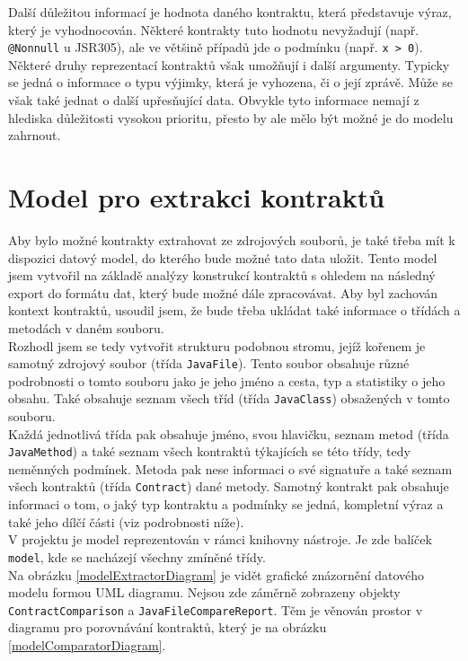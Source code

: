 		Další důležitou informací je hodnota daného kontraktu, která představuje výraz, který je vyhodnocován. Některé kontrakty tuto hodnotu nevyžadují (např. \texttt{@Nonnull} u JSR305), ale ve většině případů jde o podmínku (např. \texttt{x > 0}). Některé druhy reprezentací kontraktů však umožňují i další argumenty. Typicky se jedná o informace o typu výjimky, která je vyhozena, či o její zprávě. Může se však také jednat o další upřesňující data. Obvykle tyto informace nemají z hlediska důležitosti vysokou prioritu, přesto by ale mělo být možné je do modelu zahrnout.
		
	
	\section{Model pro extrakci kontraktů}
			Aby bylo možné kontrakty extrahovat ze zdrojových souborů, je také třeba mít k dispozici datový model, do kterého bude možné tato data uložit. Tento model jsem vytvořil na základě analýzy konstrukcí kontraktů s ohledem na následný export do formátu dat, který bude možné dále zpracovávat. Aby byl zachován kontext kontraktů, usoudil jsem, že bude třeba ukládat také informace o třídách a metodách v daném souboru.\\
			
			Rozhodl jsem se tedy vytvořit strukturu podobnou stromu, jejíž kořenem je samotný zdrojový soubor (třída \texttt{JavaFile}). Tento soubor obsahuje různé podrobnosti o tomto souboru jako je jeho jméno a cesta, typ a statistiky o jeho obsahu. Také obsahuje seznam všech tříd (třída \texttt{JavaClass}) obsažených v tomto souboru.\\
			
			Každá jednotlivá třída pak obsahuje jméno, svou hlavičku, seznam metod (třída \texttt{JavaMethod}) a také seznam všech kontraktů týkajících se této třídy, tedy neměnných podmínek. Metoda pak nese informaci o své signatuře a také seznam všech kontraktů (třída \texttt{Contract}) dané metody. Samotný kontrakt pak obsahuje informaci o tom, o jaký typ kontraktu a podmínky se jedná, kompletní výraz a také jeho dílčí části (viz podrobnosti níže).\\
			
			V projektu je model reprezentován v rámci knihovny nástroje. Je zde balíček \texttt{model}, kde se nacházejí všechny zmíněné třídy.\\
			
			Na obrázku \ref{modelExtractorDiagram} je vidět grafické znázornění datového modelu formou UML diagramu. Nejsou zde záměrně zobrazeny objekty \texttt{ContractComparison} a \texttt{JavaFileCompareReport}. Těm je věnován prostor v diagramu pro porovnávání kontraktů, který je na obrázku \ref{modelComparatorDiagram}.\\ 
							
